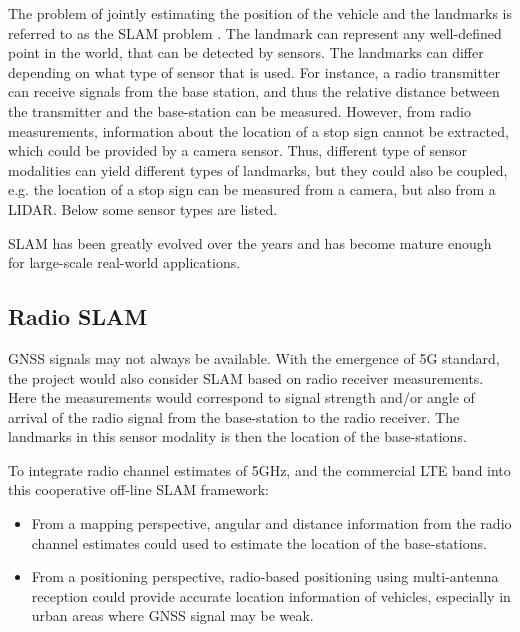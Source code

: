 The problem of jointly estimating the position of the vehicle and the landmarks 
is referred to as the \gls{SLAM} problem 
\cite{DBLP:journals/corr/CadenaCCLSN0L16}. The landmark can represent any 
well-defined point in the world, that can be detected by sensors. The landmarks 
can differ depending on what type of sensor that is used. For instance, a radio 
transmitter can receive signals from the base station, and thus the relative 
distance between the transmitter and the base-station can be measured. However, 
from radio measurements, information about the location of a stop sign cannot 
be extracted, which could be provided by a camera sensor. Thus, different type 
of sensor modalities can yield different types of landmarks, but they could 
also be coupled, e.g. the location of a stop sign can be measured from a 
camera, but also from a \gls{LIDAR}. Below some sensor types are listed.

\gls{SLAM} has been greatly evolved over the years and has become mature enough 
for large-scale real-world applications. 

\subsection{Radio SLAM}

\gls{GNSS} signals may not always be available. With the emergence of 5G
standard, the project would also consider \gls{SLAM} based on radio receiver 
measurements. Here the measurements would correspond to signal strength and/or 
angle of arrival of the radio signal from the base-station to the radio 
receiver. The landmarks in this sensor modality is then the location of the 
base-stations. 

To integrate radio channel estimates of 5GHz, and the commercial \gls{LTE} band into this cooperative 
off-line \gls{SLAM} framework:
\begin{itemize}
\item   From a mapping perspective, angular and distance information
  from the radio channel estimates could used to estimate the location of the 
  base-stations.
\item From a positioning perspective, radio-based positioning using
multi-antenna reception could provide accurate location information of
vehicles, especially in urban areas where \gls{GNSS} signal may be weak.
\end{itemize}

